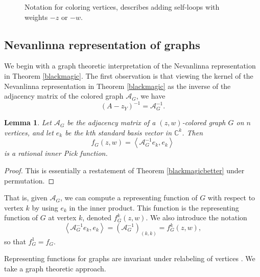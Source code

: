 \documentclass[12pt]{amsart}
\newtheorem{lemma}[theorem]{Lemma}
\theoremstyle{remark}
\newcommand{\C}{\mathbb{C}}
\newcommand{\ip}[2]{\left\langle #1, #2 \right\rangle}
\newcommand{\inv}{^{-1}}
\numberwithin{equation}{section}
\newcommand{\cA}{\mathcal{A}}
\begin{document}
\begin{figure}[!htbp]
    \centering
    \caption{Notation for coloring vertices, describes adding self-loops with weights $-z$ or $-w$.}
    \label{fig:analog}
\end{figure}


\subsection{Nevanlinna representation of graphs}

We begin with a graph theoretic interpretation of the Nevanlinna representation in Theorem \ref{blackmagic}. The first observation is that viewing the kernel of the Nevanlinna representation in Theorem \ref{blackmagic} as the inverse of the adjacency matrix of the colored graph $\cA_G$, we have
\[
(A - z_Y)\inv = \cA_G\inv.
\]

\begin{lemma}
Let $\cA_G$ be the adjacency matrix of a $(z,w)$-colored graph $G$ on $n$ vertices, and let $e_k$ be the $k$th standard basis vector in $\C^k$. Then
\[
f_G(z,w) = \ip{\cA\inv_G e_k}{e_k}
\]
is a rational inner Pick function.
\end{lemma} 
\begin{proof}
This is essentially a restatement of Theorem \ref{blackmagicbetter} under permutation.
\end{proof}


That is, given $\cA_G$, we can compute a representing function of $G$ with respect to vertex $k$ by using $e_k$ in the inner product. This function is the representing function of $G$ at vertex $k$, denoted $f_G^k(z,w)$. We also introduce the notation
\[
\ip{ \cA_G\inv e_k}{e_k} = (\cA_G\inv)_{(k,k)} = f_G^k(z,w),
\]
so that $f_G^1 = f_G$.

Representing functions for graphs are invariant under relabeling of vertices \cite[Lemma 2.3]{bickelhong}. We take a graph theoretic approach.
\end{document}
